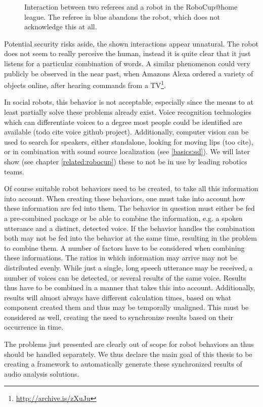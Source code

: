 \begin{figure}[]
	\caption{Interaction between two referees and a robot in the RoboCup@home league.
		The referee in blue abandons the robot, which does not acknowledge this at all.}
	\label{pic:moti:imustgonow}
\end{figure}

Potential security risks aside, the shown interactions appear unnatural.
The robot does not seem to really perceive the human, instead it is quite clear that it just listens for a particular combination of words.
A similar phenomenon could very publicly be observed in the near past, when Amazons Alexa ordered a variety of objects online, after hearing commands from a  TV\footnote{\url{http://archive.is/zXuJu}}.

In social robots, this behavior is not acceptable, especially since the means to at least partially solve these problems already exist.
Voice recognition technologies which can differentiate voices to a degree most people could be identified are available (todo cite voice github project).
Additionally, computer vision can be used to search for speakers, either standalone, looking for moving lips (too cite), or in combination with sound source localization (see \ref{basics:ssl}).
We will later show (see chapter \ref{related:robocup}) these to not be in use by leading robotics teams.

Of course suitable robot behaviors need to be created, to take all this information into account.
When creating these behaviors, one must take into account how these information are fed into them.
The behavior in question must either be fed a pre-combined package or be able to combine the information, e.g. a spoken utterance and a distinct, detected voice.
If the behavior handles the combination both may not be fed into the behavior at the same time, resulting in the problem to combine them.
A number of factors have to be considered when combining these informations.
The ratios in which information may arrive may not be distributed evenly.
While just a single, long speech utterance may be received, a number of voices can be detected, or several results of the same voice.
Results thus have to be combined in a manner that takes this into account.
Additionally, results will almost always have different calculation times, based on what component created them and thus may be temporally unaligned.
This must be considered as well, creating the need to synchronize results based on their occurrence in time.

The problems just presented are clearly out of scope for robot behaviors an thus should be handled separately.
We thus declare the main goal of this thesis to be creating a framework to automatically generate these synchronized results of audio analysis solutions.

